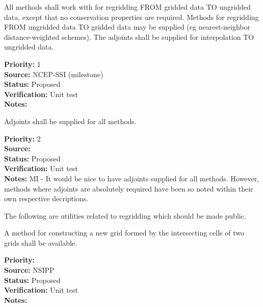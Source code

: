 All methods shall work with for regridding FROM gridded data TO ungridded 
data, except that no conservation properties are required.
Methods for regridding FROM ungridded data TO gridded data may be
supplied (eg nearest-neighbor distance-weighted schemes).
The adjoints shall be supplied for interpolation TO ungridded data.

\begin{reqlist}
{\bf Priority:} 1 \\
{\bf Source:}  NCEP-SSI (milestone) \\
{\bf Status:} Proposed \\
{\bf Verification:} Unit test \\
{\bf Notes:} 
\end{reqlist}


Adjoints shall be supplied for all methods.

\begin{reqlist}
{\bf Priority:} 2 \\
{\bf Source:}  \\
{\bf Status:} Proposed \\
{\bf Verification:} Unit test \\
{\bf Notes:} MI - It would be nice to have adjoints supplied for all methods.
             However, methods where adjoints are absolutely required
             have been so noted within their own respective decriptions.
\end{reqlist}


The following are utilities related to regridding which should be made
public.


A method for constructing a new grid formed by the intersecting
cells of two grids shall be available.

\begin{reqlist}
{\bf Priority:}  \\
{\bf Source:}  NSIPP \\
{\bf Status:} Proposed \\
{\bf Verification:} Unit test \\
{\bf Notes:} 
\end{reqlist}

